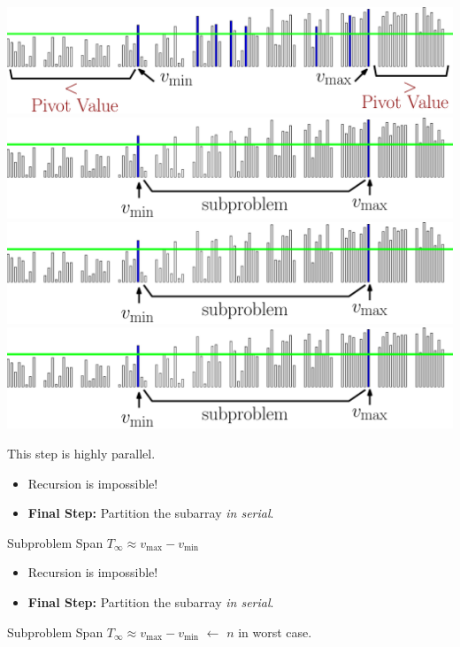 \documentclass[xcolor=x11names, svgnames, rgb]{beamer}
\begin{document}
\begin{frame}[t]{}
\begin{overprint}
	\includegraphics[width=\linewidth]{imgs/stridedAlgSim/sim4.eps}
	\onslide<6>\includegraphics[width=\linewidth]{imgs/stridedAlgSim/sim45.eps}
	\onslide<7>\includegraphics[width=\linewidth]{imgs/stridedAlgSim/sim45.eps}
	\onslide<8>\includegraphics[width=\linewidth]{imgs/stridedAlgSim/sim45.eps}
	\end{overprint}
	\vspace{0.25cm}
	\begin{overprint}
	This step is highly parallel.
 \begin{itemize} \item Recursion is impossible!  \item \textbf{Final Step: }Partition the subarray \emph{in serial}.  \end{itemize} \vspace{1cm} Subproblem Span $T_\infty \approx v_{\max} - v_{\min}$
 \begin{itemize} \item Recursion is impossible!  \item \textbf{Final Step: }Partition the subarray \emph{in serial}.  \end{itemize} \vspace{1cm} Subproblem Span $T_\infty \approx v_{\max} - v_{\min}$ {\color{blue} $\longleftarrow \,\, n $ in worst case.} %
	\end{overprint}
\end{frame}
\end{document}
